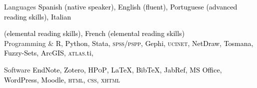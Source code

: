 





\begin{cvskills}

\cvskill
{Languages} 
{\textcolor{black}{Spanish (native speaker), English (fluent), Portuguese (advanced reading skills), Italian}} 

\cvskill
{} 
{\textcolor{black}{(elemental reading skills), French (elemental reading skills)}} \\

\cvskill
{Programming \&} 
{\textcolor{black}{R, Python, Stata, {\scshape spss/pspp}, Gephi, {\scshape ucinet}, NetDraw, Tosmana, Fuzzy-Sets, ArcGIS, {\scshape atlas}.ti,}}

\cvskill
{Software} 
{\textcolor{black}{EndNote, Zotero, {\scshape HPoP}, {\LaTeX}, Bib{\TeX}, JabRef, MS Office, WordPress, Moodle, {\scshape html}, {\scshape css}, {\scshape xhtml}}} \\

\end{cvskills}
